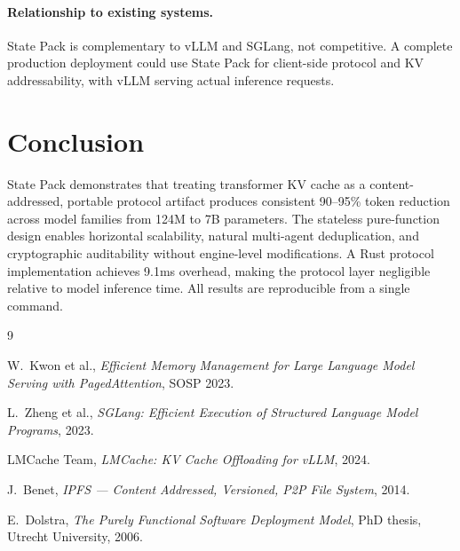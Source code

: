 \documentclass[11pt,a4paper]{article}
\begin{document}
\paragraph{Relationship to existing systems.}
State Pack is complementary to vLLM and SGLang, not competitive. A complete
production deployment could use State Pack for client-side protocol and KV
addressability, with vLLM serving actual inference requests.

\section{Conclusion}
\label{sec:conclusion}

State Pack demonstrates that treating transformer KV cache as a
content-addressed, portable protocol artifact produces consistent 90--95\%
token reduction across model families from 124M to 7B parameters. The
stateless pure-function design enables horizontal scalability, natural
multi-agent deduplication, and cryptographic auditability without
engine-level modifications. A Rust protocol implementation achieves 9.1ms
overhead, making the protocol layer negligible relative to model inference
time. All results are reproducible from a single command.

\begin{thebibliography}{9}

W.~Kwon et al.,
\emph{Efficient Memory Management for Large Language Model Serving with
PagedAttention},
SOSP 2023.

L.~Zheng et al.,
\emph{SGLang: Efficient Execution of Structured Language Model Programs},
2023.

LMCache Team,
\emph{LMCache: KV Cache Offloading for vLLM},
2024.

J.~Benet,
\emph{IPFS --- Content Addressed, Versioned, P2P File System},
2014.

E.~Dolstra,
\emph{The Purely Functional Software Deployment Model},
PhD thesis, Utrecht University, 2006.

\end{thebibliography}
\end{document}
